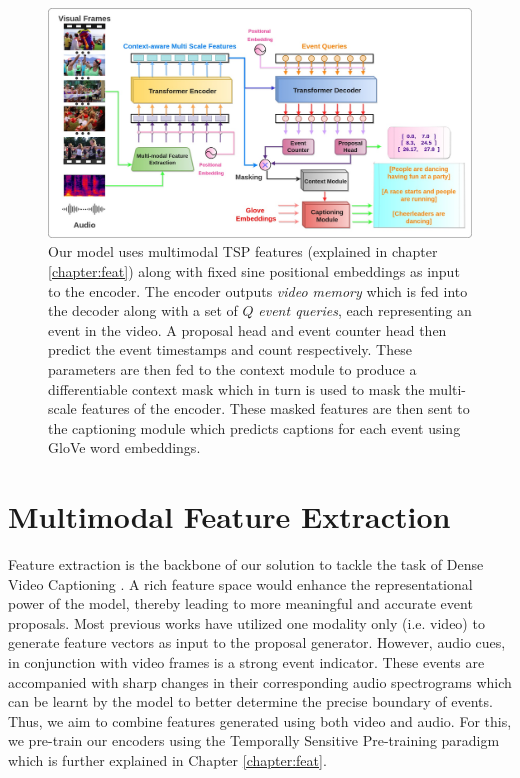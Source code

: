 \begin{figure} [H]
	\centering
	\includegraphics[width=\linewidth]{assets/img/architecture-no-bg.jpg}
	\caption{Our model uses multimodal TSP features (explained in chapter \ref{chapter:feat}) along with fixed sine positional embeddings as input to the encoder. The encoder outputs \textit{video memory} which is fed into the decoder along with a set of $Q$ \textit{event queries}, each representing an event in the video. A proposal head and event counter head then predict the event timestamps and count respectively. These parameters are then fed to the context module to produce a differentiable context mask which in turn is used to mask the multi-scale features of the encoder. These masked features are then sent to the captioning module which predicts captions for each event using GloVe word embeddings.}
\end{figure}

\section{Multimodal Feature Extraction}
\par Feature extraction is the backbone of our solution to tackle the task of Dense Video Captioning \cite{krishna2017densecaptioning}. A rich feature space would enhance the representational power of the model, thereby leading to more meaningful and accurate event proposals. Most previous works have utilized one modality only (i.e. video) to generate feature vectors as input to the proposal generator. However, audio cues, in conjunction with video frames is a strong event indicator. These events are accompanied with sharp changes in their corresponding audio spectrograms which can be learnt by the model to better determine the precise boundary of events. Thus, we aim to combine features generated using both video and audio. For this, we pre-train our encoders using the Temporally Sensitive Pre-training \cite{alwassel2021tsp} paradigm which is further explained in Chapter \ref{chapter:feat}.


